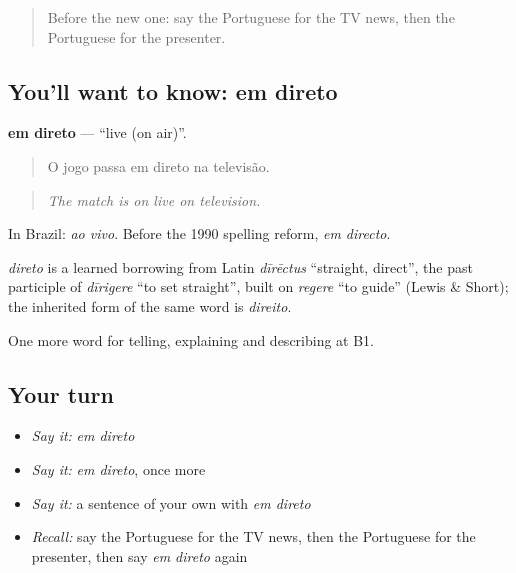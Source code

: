 \begin{quote}
Before the new one: say the Portuguese for the TV news, then the Portuguese for the presenter.
\end{quote}

\subsection*{You'll want to know: em direto}
\textbf{em direto} — \textquotedblleft{}live (on air)\textquotedblright{}.

\begin{quote}
O jogo passa em direto na televisão.
\end{quote}

\begin{quote}
\emph{The match is on live on television.}
\end{quote}

In Brazil: \emph{ao vivo}. Before the 1990 spelling reform, \emph{em directo}.

\begin{cousinweb}
\emph{direto} is a learned borrowing from Latin \emph{dīrēctus} \textquotedblleft{}straight, direct\textquotedblright{}, the past participle of \emph{dīrigere} \textquotedblleft{}to set straight\textquotedblright{}, built on \emph{regere} \textquotedblleft{}to guide\textquotedblright{} (Lewis \& Short); the inherited form of the same word is \emph{direito}.
\end{cousinweb}

\begin{grammarlens}[title={What you've built}]
One more word for telling, explaining and describing at B1.
\end{grammarlens}

\subsection*{Your turn}
\begin{itemize}
\raggedright
  \item \emph{Say it:} \emph{em direto}
  \item \emph{Say it:} \emph{em direto}, once more
  \item \emph{Say it:} a sentence of your own with \emph{em direto}
  \item \emph{Recall:} say the Portuguese for the TV news, then the Portuguese for the presenter, then say \emph{em direto} again
\end{itemize}

